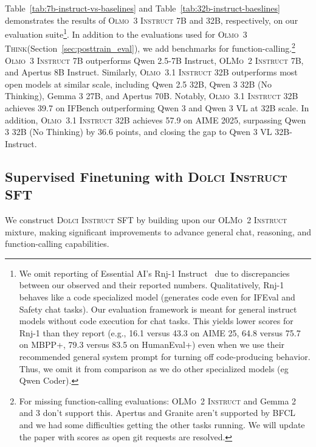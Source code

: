 \documentclass[table]{ai2style/ai2}
\newcommand{\oldOlmo}{OLMo\xspace}
\newcommand{\newOlmo}{Olmo\xspace}
\newcommand{\olmotooinstruct}{\textsc{\oldOlmo~2 Instruct}\xspace}
\newcommand{\olmothreeinstruct}{\textsc{\newOlmo~3 Instruct}\xspace}
\newcommand{\olmothreeoneinstruct}{\textsc{\newOlmo~3.1 Instruct}\xspace}
\newcommand{\olmothreethinking}{\textsc{Olmo~3 Think}\xspace}
\newcommand{\dolciinstructsft}{\textsc{Dolci Instruct SFT}\xspace}
\begin{document}
{{Table~\ref{tab:7b-instruct-vs-baselines} and Table~\ref{tab:32b-instruct-baeslines} demonstrates the results of \olmothreeinstruct 7B and 32B, respectively, on our evaluation suite\footnote{We omit reporting of Essential AI’s Rnj-1 Instruct~\citep{vaswani2025rnj1} due to discrepancies between our observed and their reported numbers. Qualitatively, Rnj-1 behaves like a code specialized model (generates code even for IFEval and Safety chat tasks). Our evaluation framework is meant for general instruct models without code execution for chat tasks. This yields lower scores for Rnj-1 than they report (e.g., 16.1 versus 43.3 on AIME 25, 64.8 versus 75.7 on MBPP+, 79.3 versus 83.5 on HumanEval+) even when we use their recommended general system prompt for turning off code-producing behavior. Thus, we omit it from comparison as we do other specialized models (eg Qwen Coder).}.
In addition to the evaluations used for \olmothreethinking (Section~\ref{sec:posttrain_eval}), we add benchmarks for function-calling.\footnote{For missing function-calling evaluations: \olmotooinstruct and Gemma 2 and 3 don't support this. Apertus and Granite aren't supported by BFCL and we had some difficulties getting the other tasks running. We will update the paper with scores as open git requests are resolved.}
\olmothreeinstruct 7B outperforms Qwen 2.5-7B Instruct, \olmotooinstruct 7B, and Apertus 8B Instruct.
Similarly, \olmothreeoneinstruct 32B outperforms most open models at similar scale, including Qwen 2.5 32B, Qwen 3 32B (No Thinking), Gemma 3 27B, and Apertus 70B. Notably, \olmothreeoneinstruct 32B achieves 39.7 on IFBench outperforming Qwen 3 and Qwen 3 VL at 32B scale. In addition,  \olmothreeoneinstruct 32B achieves 57.9 on AIME 2025, surpassing Qwen 3 32B (No Thinking) by 36.6 points, and closing the gap to Qwen 3 VL 32B-Instruct. 

\subsection{Supervised Finetuning with \dolciinstructsft}
We construct \dolciinstructsft by building upon our \olmotooinstruct mixture, making significant improvements to advance general chat, reasoning, and function-calling capabilities.

}}
\end{document}
